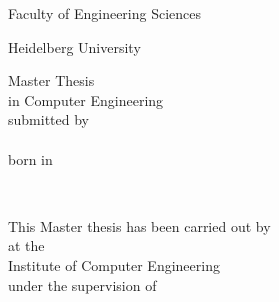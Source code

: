 \thispagestyle{empty}
\begin{addmargin}[-1cm]{-3cm}
	\begin{center}
		\begingroup
		\Huge Faculty of Engineering Sciences \\ \medskip
		\endgroup

		\begingroup
		\Large Heidelberg University \\ \bigskip
		\endgroup

		\hfill
		\vfill

		\begingroup
    \Large
		Master Thesis \\
		in Computer Engineering \\
		submitted by \\
		\myName \\
		born in \myPlaceOfBirth \\
		\myThesisSubmissionDate
		\endgroup
	\end{center}
\end{addmargin}

\begin{titlepage}
\begin{addmargin}[-1cm]{-3cm}
	\begin{center}
		\large
		\begingroup
		\huge
		\spacedallcaps{\myThesisTitle} \\ \bigskip
		\endgroup
		\vfill
		\hfill

		This Master thesis has been carried out by \myName \\
		at the \\
		Institute of Computer Engineering \\
		under the supervision of \\
		\myProf
	\end{center}
\end{addmargin}
\end{titlepage}
